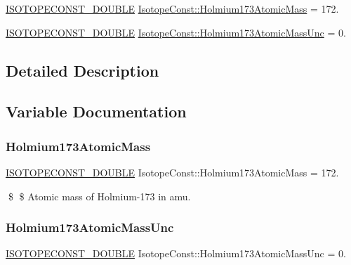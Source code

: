\begin{DoxyCompactItemize}
\item 
\mbox{\hyperlink{group___isotope_const-_macros_ga8f45a7272ce02c0b4c65c44636ed719a}{I\+S\+O\+T\+O\+P\+E\+C\+O\+N\+S\+T\+\_\+\+D\+O\+U\+B\+LE}} \mbox{\hyperlink{group___isotope_const-_holmium-_ho173_gad9675b331c79901e39de0006c18b1a54}{Isotope\+Const\+::\+Holmium173\+Atomic\+Mass}} = 172.
\item 
\mbox{\hyperlink{group___isotope_const-_macros_ga8f45a7272ce02c0b4c65c44636ed719a}{I\+S\+O\+T\+O\+P\+E\+C\+O\+N\+S\+T\+\_\+\+D\+O\+U\+B\+LE}} \mbox{\hyperlink{group___isotope_const-_holmium-_ho173_ga3f23e9a67753a81ff14a006ee6c225b1}{Isotope\+Const\+::\+Holmium173\+Atomic\+Mass\+Unc}} = 0.
\end{DoxyCompactItemize}


\subsection{Detailed Description}


\subsection{Variable Documentation}
\mbox{\label{group___isotope_const-_holmium-_ho173_gad9675b331c79901e39de0006c18b1a54}} 
\subsubsection{\texorpdfstring{Holmium173\+Atomic\+Mass}{Holmium173AtomicMass}}
{\footnotesize\ttfamily \mbox{\hyperlink{group___isotope_const-_macros_ga8f45a7272ce02c0b4c65c44636ed719a}{I\+S\+O\+T\+O\+P\+E\+C\+O\+N\+S\+T\+\_\+\+D\+O\+U\+B\+LE}} Isotope\+Const\+::\+Holmium173\+Atomic\+Mass = 172.}

\$ \$ Atomic mass of Holmium-\/173 in amu. \mbox{\label{group___isotope_const-_holmium-_ho173_ga3f23e9a67753a81ff14a006ee6c225b1}} 
\subsubsection{\texorpdfstring{Holmium173\+Atomic\+Mass\+Unc}{Holmium173AtomicMassUnc}}
{\footnotesize\ttfamily \mbox{\hyperlink{group___isotope_const-_macros_ga8f45a7272ce02c0b4c65c44636ed719a}{I\+S\+O\+T\+O\+P\+E\+C\+O\+N\+S\+T\+\_\+\+D\+O\+U\+B\+LE}} Isotope\+Const\+::\+Holmium173\+Atomic\+Mass\+Unc = 0.}

